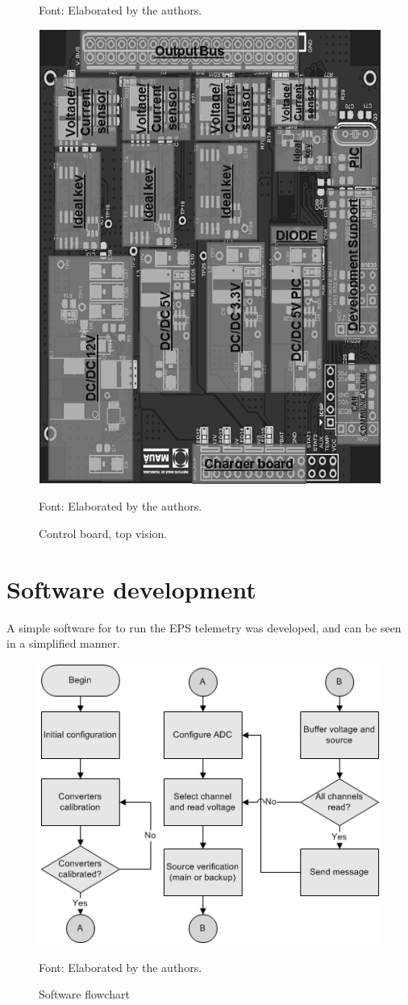 \documentclass[3p]{elsarticle}
\begin{document}
\begin{figure}[th]
\begin{minipage}[b]{0.3\textwidth}
	    \begin{footnotesize}
		Font: Elaborated by the authors.
		\end{footnotesize}
	  \end{minipage}
	  \hfill
	  \begin{minipage}[b]{0.3\textwidth}
		\label{charger}
		\centering
		\includegraphics[width=0.6\linewidth]{./figs/control}
	    \caption{Control board, top vision.}
	    
	    \begin{footnotesize}
		Font: Elaborated by the authors.
		\end{footnotesize}
	  \end{minipage}
	\end{figure}
	
\section{Software development}
\label{Software development}

	A simple software for to run the EPS telemetry was developed, and can be seen in a simplified manner.
	
	\begin{figure}[th]
		\label{flow}
		\centering
		\includegraphics[width=0.3\linewidth]{./figs/fluxo2}
		\caption{Software flowchart}
	
		\begin{footnotesize}
		Font: Elaborated by the authors.
		\end{footnotesize}
	\end{figure}
\end{document}
